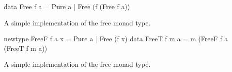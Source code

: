   \begin{code}
\begin{haskellcode}
data Free f a
  = Pure a
  | Free (f (Free f a))
\end{haskellcode}
    \caption{\label{lst:free_def_naive}A simple implementation of the free
      monad type.}
  \end{code}

  \begin{code}
\begin{haskellcode}
newtype FreeF f a x = Pure a | Free (f x)
data FreeT f m a = m (FreeF f a (FreeT f m a))
\end{haskellcode}
    \caption{\label{lst:free_def}A simple implementation of the free
      monad type.}
  \end{code}

